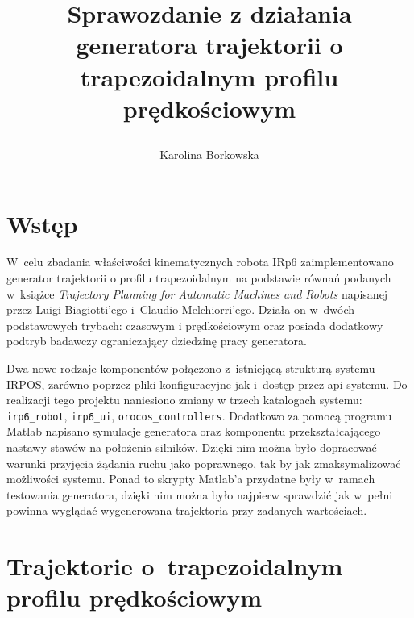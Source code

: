 \documentclass[a4paper, 12pt]{article}
\title{Sprawozdanie z działania generatora trajektorii o trapezoidalnym profilu prędkościowym \author{Karolina Borkowska}}
\begin{document}
	\maketitle

	\vspace{50px}

	\section{Wstęp}
	\label{sec:intro}
	
	W~celu zbadania właściwości kinematycznych robota IRp6 zaimplementowano generator trajektorii o profilu trapezoidalnym na podstawie równań podanych w~książce \textit{Trajectory Planning for Automatic Machines and Robots} napisanej przez Luigi Biagiotti'ego i~Claudio Melchiorri'ego. Działa on w~dwóch podstawowych trybach: czasowym i prędkościowym oraz posiada dodatkowy podtryb badawczy ograniczający dziedzinę pracy generatora.
	\par Dwa nowe rodzaje komponentów połączono z~istniejącą strukturą systemu IRPOS, zarówno poprzez pliki konfiguracyjne jak i~dostęp przez api systemu. Do realizacji tego projektu naniesiono zmiany w trzech katalogach systemu: \texttt{irp6\_robot}, \texttt{irp6\_ui}, \texttt{orocos\_controllers}. Dodatkowo za pomocą programu Matlab napisano symulacje generatora oraz komponentu przekształcającego nastawy stawów na położenia silników. Dzięki nim można było dopracować warunki przyjęcia żądania ruchu jako poprawnego, tak by jak zmaksymalizować możliwości systemu. Ponad to skrypty Matlab'a przydatne były w~ramach testowania generatora, dzięki nim można było najpierw sprawdzić jak w~pełni powinna wyglądać wygenerowana trajektoria przy zadanych wartościach.
	
	\section{Trajektorie o~trapezoidalnym profilu prędkościowym}
	\label{sec:math}
	
\end{document}
